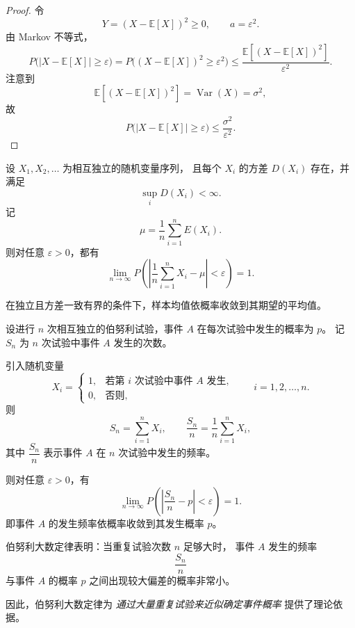 \begin{proof}
令
\[
Y=(X-\mathbb E[X])^2\ge 0,\qquad a=\varepsilon^2.
\]
由 Markov 不等式，
\[
P\bigl(|X-\mathbb E[X]|\ge \varepsilon\bigr)
=
P\bigl((X-\mathbb E[X])^2\ge \varepsilon^2\bigr)
\le
\frac{\mathbb E\!\left[(X-\mathbb E[X])^2\right]}{\varepsilon^2}.
\]
注意到
\[
\mathbb E\!\left[(X-\mathbb E[X])^2\right]
=\operatorname{Var}(X)
=\sigma^2,
\]
故
\[
P\bigl(|X-\mathbb E[X]|\ge \varepsilon\bigr)
\le \frac{\sigma^2}{\varepsilon^2}.
\]
\end{proof}
\begin{theorem}
设 $X_1,X_2,\dots$ 为相互独立的随机变量序列，
且每个 $X_i$ 的方差 $D(X_i)$ 存在，并满足
\[
\sup_{i} D(X_i)<\infty.
\]
记
\[
\mu=\frac{1}{n}\sum_{i=1}^n E(X_i).
\]
则对任意 $\varepsilon>0$，都有
\[
\lim_{n\to\infty}
P\!\left(
\left|
\frac{1}{n}\sum_{i=1}^n X_i-\mu
\right|<\varepsilon
\right)=1.
\]
\end{theorem}
在独立且方差一致有界的条件下，样本均值依概率收敛到其期望的平均值。
\begin{theorem}[伯努利大数定律]
设进行 $n$ 次相互独立的伯努利试验，事件 $A$ 在每次试验中发生的概率为 $p$。
记 $S_n$ 为 $n$ 次试验中事件 $A$ 发生的次数。

引入随机变量
\[
X_i=
\begin{cases}
1, & \text{若第 $i$ 次试验中事件 $A$ 发生},\\
0, & \text{否则},
\end{cases}
\qquad i=1,2,\dots,n.
\]
则
\[
S_n=\sum_{i=1}^n X_i,
\qquad
\frac{S_n}{n}=\frac{1}{n}\sum_{i=1}^n X_i,
\]
其中 $\dfrac{S_n}{n}$ 表示事件 $A$ 在 $n$ 次试验中发生的频率。

则对任意 $\varepsilon>0$，有
\[
\lim_{n\to\infty}
P\!\left(
\left|\frac{S_n}{n}-p\right|<\varepsilon
\right)=1.
\]
即事件 $A$ 的发生频率依概率收敛到其发生概率 $p$。
\end{theorem}
\begin{note}[伯努利大数定律的含义]
伯努利大数定律表明：当重复试验次数 $n$ 足够大时，
事件 $A$ 发生的频率
\[
\frac{S_n}{n}
\]
与事件 $A$ 的概率 $p$ 之间出现较大偏差的概率非常小。

因此，伯努利大数定律为
\emph{通过大量重复试验来近似确定事件概率}
提供了理论依据。
\end{note}

